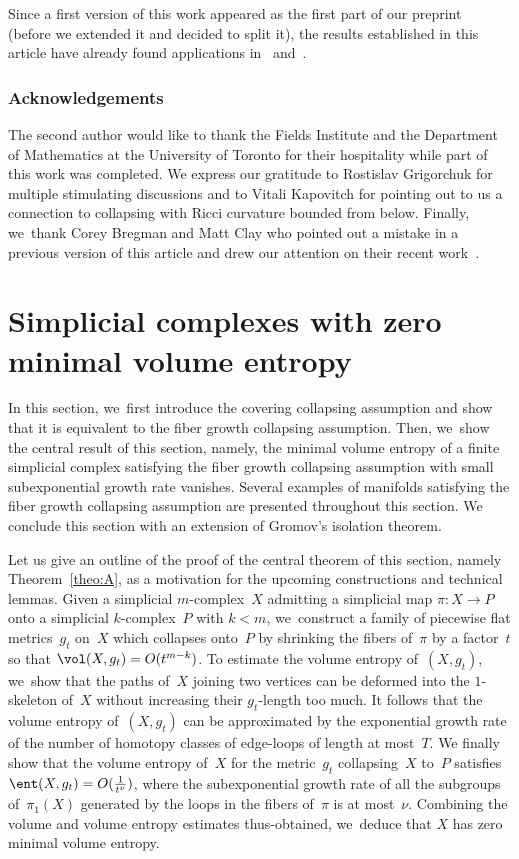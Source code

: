 Since a first version of this work appeared as the first part of our preprint~\cite{BS2} (before we extended it and decided to split it), the results established in this article have already found applications in~\cite{BC} and~\cite{LM}.

\subsubsection*{Acknowledgements} The second author would like to thank the Fields Institute and the Department of Mathematics at the University of Toronto for their hospitality while part of this work was completed.
We express our gratitude to Rostislav Grigorchuk for multiple stimulating discussions and to Vitali Kapovitch for pointing out to us a connection to collapsing with Ricci curvature bounded from below.
Finally, we~thank Corey Bregman and Matt Clay who pointed out a mistake in a previous version of this article and drew our attention on their recent work~\cite{BC}.

\section{Simplicial complexes with zero minimal volume entropy}

In this section, we~first introduce the covering collapsing assumption and show that it is equivalent to the fiber growth collapsing assumption.
Then, we~show the central result of this section, namely, the minimal volume entropy of a finite simplicial complex satisfying the fiber growth collapsing assumption with small subexponential growth rate vanishes.
Several examples of manifolds satisfying the fiber growth collapsing assumption are presented throughout this section.
We conclude this section with an extension of Gromov's isolation theorem.

Let us give an outline of the proof of the central theorem of this section, namely Theorem~\ref{theo:A}, as a motivation for the upcoming constructions and technical lemmas.
Given a simplicial $m$\nobreakdash-complex~$X$ admitting a simplicial map $\pi:X \to P$ onto a simplicial $k$-complex~$P$ with $k < m$, we~construct a family of piecewise flat metrics~$g_t$ on~$X$ which collapses onto~$P$ by shrinking the fibers of~$\pi$ by a factor~$t$ so that $\vol(X,g_t) = O(t^{m-k})$.
To estimate the volume entropy of~$(X,g_t)$, we~show that the paths of~$X$ joining two vertices can be deformed into the $1$-skeleton of~$X$ without increasing their $g_t$-length too much.
It follows that the volume entropy of~$(X,g_t)$ can be approximated by the exponential growth rate of the number of homotopy classes of edge-loops of length at most~$T$.
We finally show that the volume entropy of~$X$ for the metric~$g_t$ collapsing~$X$ to~$P$ satisfies $\ent(X,g_t) = O(\frac{1}{t^\nu})$, where the subexponential growth rate of all the subgroups of~$\pi_1(X)$ generated by the loops in the fibers of~$\pi$ is at most~$\nu$.
Combining the volume and volume entropy estimates thus-obtained, we~deduce that $X$ has zero minimal volume entropy.

